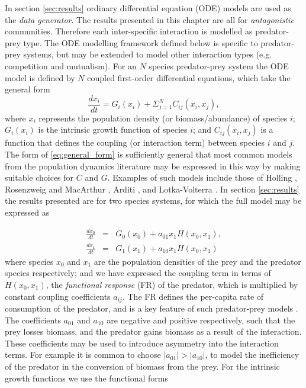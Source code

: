 In section \ref{sec:results} ordinary differential equation (ODE) models are used as the \emph{data generator}. The results presented in this chapter are all for \emph{antagonistic} communities. Therefore each inter-specific interaction is modelled as predator-prey type. The ODE modelling framework defined below is specific to predator-prey systems, but may be extended  to model other interaction types (e.g. competition and mutualism). For an $N$ species predator-prey system the ODE model is defined by $N$ coupled first-order differential equations, which take the general form
\begin{equation}
\frac{dx_i}{dt} = G_i(x_i) + \Sigma_{j=1}^N C_{ij}(x_i,x_j),
\label{eq:general_form}
\end{equation}
%
where $x_i$ represents the population density (or biomass/abundance) of species $i$; $G_i(x_i)$ is the intrinsic growth function of species $i$; and $C_{ij}(x_i,x_j)$ is a function that defines the coupling (or interaction term) between species $i$ and $j$. The form of \eqref{eq:general_form} is sufficiently general that most common models from the population dynamics literature may be expressed in this way by making suitable choices for $C$ and $G$. Examples of such models include those of Holling \cite{holling1959some}, Rosenzweig and MacArthur \cite{rosenzweig1963graphical}, Arditi \cite{arditi2012species}, and Lotka-Volterra \cite{volterra1926,lotka1925elements}. In section \ref{sec:results} the results presented are for two species systems, for which the full model may be expressed as

\begin{eqnarray}
\frac{dx_0}{dt} &=& G_{0}(x_0) + a_{01}x_1H(x_0,x_1),  \nonumber \\[10pt]
\frac{dx_1}{dt} &=& G_{1}(x_1) + a_{10}x_1H(x_0,x_1)
\label{eq:two_species}
\end{eqnarray}
%
where species $x_0$ and $x_1$ are the population densities of the prey and the predator species respectively; and we have expressed the coupling term in terms of $H(x_0,x_1)$, the \emph{functional response} (FR) of the predator, which is multiplied by constant coupling coefficients $a_{ij}$. The FR defines the per-capita rate of consumption of the predator, and is a key feature of such predator-prey models \cite{barraquand2014functional,jost2000identifying}. The coefficients $a_{01}$ and $a_{10}$ are negative and positive respectively, such that the prey losses biomass, and the predator gains biomass as a result of the interaction. These coefficients may be used to introduce asymmetry into the interaction terms. For example it is common to choose $|a_{01}| > |a_{10}|$, to model the inefficiency of the predator in the conversion of biomass from the prey. For the intrinsic growth functions we use the functional forms  

